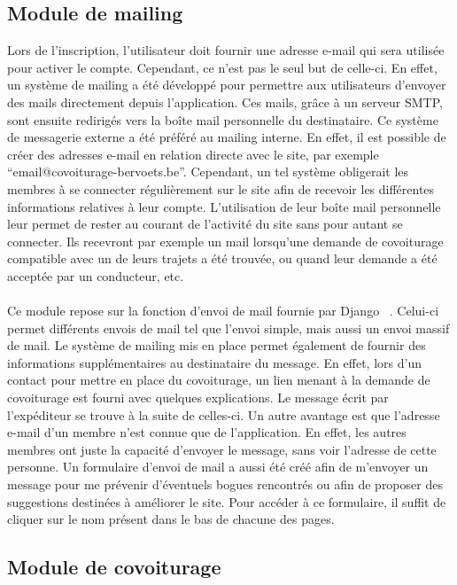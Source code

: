 \documentclass[12pt, a4paper, oneside]{article}
\begin{document}
\subsection{Module de mailing} \label{mail}
    Lors de l'inscription, l'utilisateur doit fournir une adresse e-mail qui sera utilisée pour activer le compte. Cependant, ce n'est pas le seul but de celle-ci. En effet, un système de mailing a été développé pour permettre aux utilisateurs d'envoyer des mails directement depuis l'application. Ces mails, grâce à un serveur SMTP, sont ensuite redirigés vers la boîte mail personnelle du destinataire. Ce système de messagerie externe a été préféré au mailing interne. En effet, il est possible de créer des adresses e-mail en relation directe avec le site, par exemple ``email@covoiturage-bervoets.be''. Cependant, un tel système obligerait les membres à se connecter régulièrement sur le site afin de recevoir les différentes informations relatives à leur compte. L'utilisation de leur boîte mail personnelle leur permet de rester au courant de l'activité du site sans pour autant se connecter. Ils recevront par exemple un mail lorsqu'une demande de covoiturage compatible avec un de leurs trajets a été trouvée, ou quand leur demande a été acceptée par un conducteur, etc. \\\\
    \indent Ce module repose sur la fonction d'envoi de mail fournie par Django ~\cite{django-mail}. Celui-ci permet différents envois de mail tel que l'envoi simple, mais aussi un envoi massif de mail. %
    Le système de mailing mis en place permet également de fournir des informations supplémentaires au destinataire du message. En effet, lors d'un contact pour mettre en place du covoiturage, un lien menant à la demande de covoiturage est fourni avec quelques explications. Le message écrit par l'expéditeur se trouve à la suite de celles-ci. Un autre avantage est que l'adresse e-mail d'un membre n'est connue que de l'application. En effet, les autres membres ont juste la capacité d'envoyer le message, sans voir l'adresse de cette personne. Un formulaire d'envoi de mail a aussi été créé afin de m'envoyer un message pour me prévenir d'éventuels bogues rencontrés ou afin de proposer des suggestions destinées à améliorer le site. Pour accéder à ce formulaire, il suffit de cliquer sur le nom présent dans le bas de chacune des pages.
\subsection{Module de covoiturage} \label{covoiturage}
\end{document}
